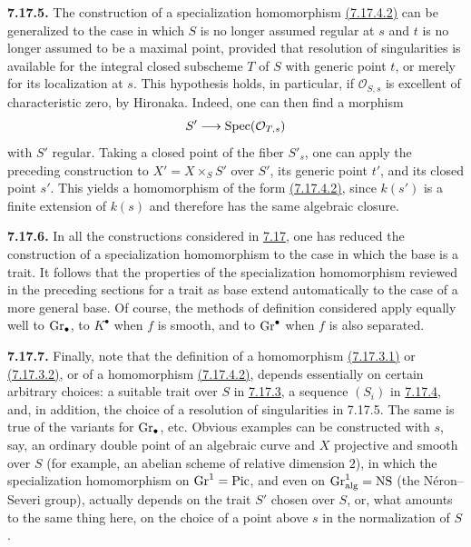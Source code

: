 \textbf{7.17.5.}
The construction of a specialization homomorphism \hyperlink{sga6.e10.eq.7-17-4-2}{(7.17.4.2)} can be
generalized to the case in which $S$ is no longer assumed regular at $s$
and $t$ is no longer assumed to be a maximal point, provided that resolution
of singularities is available for the integral closed subscheme $T$ of $S$
with generic point $t$, or merely for its localization at $s$. This
hypothesis holds, in particular, if $\mathcal O_{S,s}$ is excellent of
characteristic zero, by Hironaka. Indeed, one can then find a morphism
\[
S'\longrightarrow\operatorname{Spec}(\mathcal O_{T,s})
\]
with $S'$ regular. Taking a closed point of the fiber $S'_s$, one can apply
the preceding construction to $X'=X\times_SS'$ over $S'$, its generic point
$t'$, and its closed point $s'$. This yields a homomorphism of the form
\hyperlink{sga6.e10.eq.7-17-4-2}{(7.17.4.2)}, since $k(s')$ is a finite extension of $k(s)$ and therefore has
the same algebraic closure.

\textbf{7.17.6.}
In all the constructions considered in \hyperlink{sga6.e10.sec.7.17}{7.17}, one has reduced the
construction of a specialization homomorphism to the
case in which the base is a trait. It follows that the properties of the
specialization homomorphism reviewed in the preceding sections for a trait
as base extend automatically to the case of a more general base. Of course,
the methods of definition considered apply equally well to $\operatorname{Gr}_\bullet$,
to $K^\bullet$ when $f$ is smooth, and to $\operatorname{Gr}^\bullet$ when $f$ is also
separated.

\textbf{7.17.7.}
Finally, note that the definition of a homomorphism \hyperlink{sga6.e10.eq.7-17-3-1}{(7.17.3.1)} or
\hyperlink{sga6.e10.eq.7-17-3-2}{(7.17.3.2)}, or of a homomorphism \hyperlink{sga6.e10.eq.7-17-4-2}{(7.17.4.2)}, depends essentially on certain
arbitrary choices: a suitable trait over $S$ in \hyperlink{sga6.e10.para.7-17-3}{7.17.3}, a sequence $(S_i)$
in \hyperlink{sga6.e10.para.7-17-4}{7.17.4}, and, in addition, the choice of a resolution of singularities in
7.17.5. The same is true of the variants for $\operatorname{Gr}_\bullet$, etc. Obvious
examples can be constructed with $s$, say, an ordinary double point of an
algebraic curve and $X$ projective and smooth over $S$ (for example, an
abelian scheme of relative dimension $2$), in which the specialization
homomorphism on $\operatorname{Gr}^1=\operatorname{Pic}$, and even on
$\operatorname{Gr}^1_{\mathrm{alg}}=\mathrm{NS}$ (the Néron--Severi group), actually
depends on the trait $S'$ chosen over $S$, or, what amounts to the same thing
here, on the choice of a point above $s$ in the normalization of $S$.

